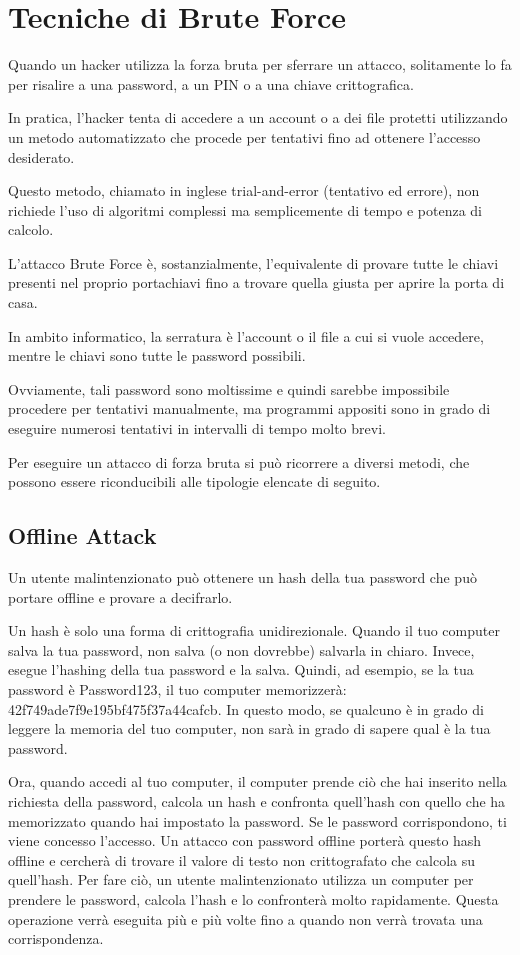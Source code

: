 \chapter{Tecniche di Brute Force}
Quando un hacker utilizza la forza bruta per sferrare un attacco, solitamente lo fa per risalire a una password, a un PIN o a una chiave crittografica.

In pratica, l'hacker tenta di accedere a un account o a dei file protetti utilizzando un metodo automatizzato che procede per tentativi fino ad ottenere l'accesso desiderato.

Questo metodo, chiamato in inglese trial-and-error (tentativo ed errore), non richiede l'uso di algoritmi complessi ma semplicemente di tempo e potenza di calcolo.

L'attacco Brute Force è, sostanzialmente, l'equivalente di provare tutte le chiavi presenti nel proprio portachiavi fino a trovare quella giusta per aprire la porta di casa.

In ambito informatico, la serratura è l'account o il file a cui si vuole accedere, mentre le chiavi sono tutte le password possibili.

Ovviamente, tali password sono moltissime e quindi sarebbe impossibile procedere per tentativi manualmente, ma programmi appositi sono in grado di eseguire numerosi tentativi in intervalli di tempo molto brevi.

Per eseguire un attacco di forza bruta si può ricorrere a diversi metodi, che possono essere riconducibili alle tipologie elencate di seguito.
\section{Offline Attack}

Un utente malintenzionato può ottenere un hash della tua password che può portare offline \cite{Offline_attack} e provare a decifrarlo.

Un hash è solo una forma di crittografia unidirezionale. Quando il tuo computer salva la tua password, non salva (o non dovrebbe) salvarla in chiaro. Invece, esegue l'hashing della tua password e la salva. Quindi, ad esempio, se la tua password è Password123, il tuo computer memorizzerà: 42f749ade7f9e195bf475f37a44cafcb. In questo modo, se qualcuno è in grado di leggere la memoria del tuo computer, non sarà in grado di sapere qual è la tua password.

Ora, quando accedi al tuo computer, il computer prende ciò che hai inserito nella richiesta della password, calcola un hash e confronta quell'hash con quello che ha memorizzato quando hai impostato la password. Se le password corrispondono, ti viene concesso l'accesso. Un attacco con password offline porterà questo hash offline e cercherà di trovare il valore di testo non crittografato che calcola su quell'hash. Per fare ciò, un utente malintenzionato utilizza un computer per prendere le password, calcola l'hash e lo confronterà molto rapidamente. Questa operazione verrà eseguita più e più volte fino a quando non verrà trovata una corrispondenza.


